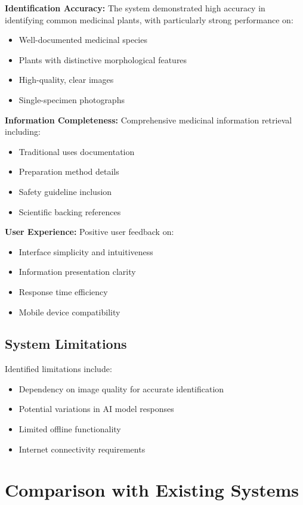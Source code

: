 \documentclass[conference]{IEEEtran}
\begin{document}
\textbf{Identification Accuracy:} The system demonstrated high accuracy in identifying common medicinal plants, with particularly strong performance on:
\begin{itemize}
\item Well-documented medicinal species
\item Plants with distinctive morphological features
\item High-quality, clear images
\item Single-specimen photographs
\end{itemize}

\textbf{Information Completeness:} Comprehensive medicinal information retrieval including:
\begin{itemize}
\item Traditional uses documentation
\item Preparation method details
\item Safety guideline inclusion
\item Scientific backing references
\end{itemize}

\textbf{User Experience:} Positive user feedback on:
\begin{itemize}
\item Interface simplicity and intuitiveness
\item Information presentation clarity
\item Response time efficiency
\item Mobile device compatibility
\end{itemize}

\subsection{System Limitations}

Identified limitations include:
\begin{itemize}
\item Dependency on image quality for accurate identification
\item Potential variations in AI model responses
\item Limited offline functionality
\item Internet connectivity requirements
\end{itemize}

\section{Comparison with Existing Systems}
\end{document}
